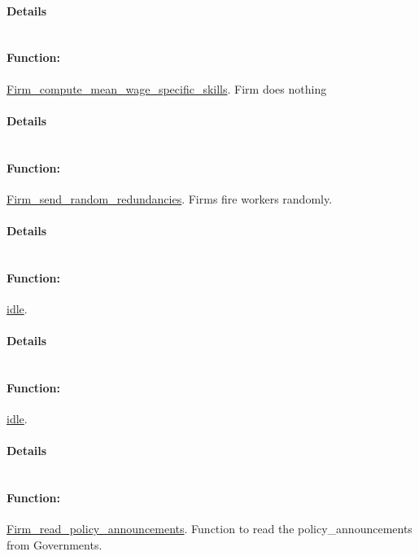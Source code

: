 \documentclass[a4paper,11pt]{article}
\begin{document}
\paragraph{Details}
\begin{verbatim}
\end{verbatim}
\paragraph{Function:}\url{Firm_compute_mean_wage_specific_skills}.
Firm does nothing
\paragraph{Details}
\begin{verbatim}
\end{verbatim}
\paragraph{Function:}\url{Firm_send_random_redundancies}.
Firms fire workers randomly.
\paragraph{Details}
\begin{verbatim}
\end{verbatim}
\paragraph{Function:}\url{idle}.

\paragraph{Details}
\begin{verbatim}
\end{verbatim}
\paragraph{Function:}\url{idle}.

\paragraph{Details}
\begin{verbatim}
\end{verbatim}
\paragraph{Function:}\url{Firm_read_policy_announcements}.
Function to read the policy\_announcements from Governments.
\end{document}

